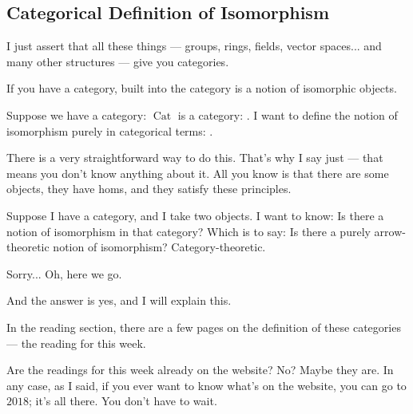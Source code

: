 \subsection{Categorical Definition of Isomorphism}

\begin{speech}[01:17:26 - 01:19:18]
I just assert that all these things --- groups, rings, fields, vector spaces...  and many other structures --- give you categories.

If you have a category, built into the category is a notion of isomorphic objects.

Suppose we have a category: $\operatorname{Cat}$ is a category:  . I want to define the notion of isomorphism purely in categorical terms:  .

There is a very straightforward way to do this. That's why I say just  --- that means you don't know anything about it. All you know is that there are some objects, they have homs, and they satisfy these principles.

Suppose I have a category, and I take two objects. I want to know: Is there a notion of isomorphism in that category? Which is to say: Is there a purely arrow-theoretic notion of isomorphism? Category-theoretic.

Sorry...  Oh, here we go.

And the answer is yes, and I will explain this.
\end{speech}

\begin{hidden}
\end{hidden}

\begin{speech}[01:19:18 - 01:20:08]
In the reading section, there are a few pages on the definition of these categories --- the reading for this week.

Are the readings for this week already on the website? No? Maybe they are. In any case, as I said, if you ever want to know what's on the website, you can go to $2018$; it's all there. You don't have to wait.
\end{speech}

